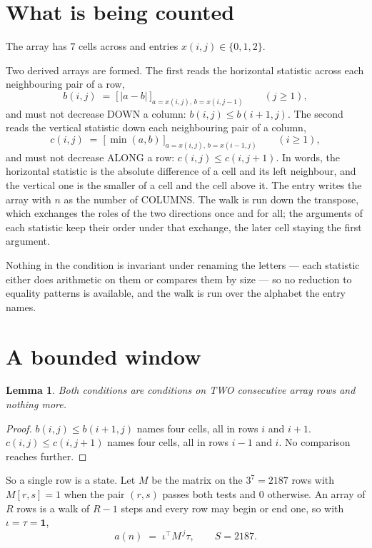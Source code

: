 \documentclass[11pt,a4paper]{article}
\theoremstyle{plain}
\newtheorem{lemma}[theorem]{Lemma}
\theoremstyle{definition}
\begin{document}
\section{What is being counted}

The array has $7$ cells across and entries $x(i,j)\in\{0,1,2\}$.

Two derived arrays are formed. The first reads the horizontal statistic across each
neighbouring pair of a row,
\[
b(i,j)\;=\;\bigl[\,\lvert a-b\rvert\,\bigr]_{a=x(i,j),\,b=x(i,j-1)}\qquad (j\ge1),
\]
and must not decrease DOWN a column: $b(i,j)\le b(i{+}1,j)$. The second reads the vertical
statistic down each neighbouring pair of a column,
\[
c(i,j)\;=\;\bigl[\,\min(a,b)\,\bigr]_{a=x(i,j),\,b=x(i{-}1,j)}\qquad (i\ge1),
\]
and must not decrease ALONG a row: $c(i,j)\le c(i,j{+}1)$. In words, the horizontal statistic
is the absolute difference of a cell and its left neighbour, and the vertical one is
the smaller of a cell and the cell above it. The entry writes the array with $n$ as the number of COLUMNS. The walk is run down the transpose, which exchanges the roles of the two directions once and for all; the arguments of each statistic keep their order under that exchange, the later cell staying the first argument.

Nothing in the condition is invariant under renaming the letters --- each statistic either does
arithmetic on them or compares them by size --- so no reduction to equality patterns is
available, and the walk is run over the alphabet the entry names.

\section{A bounded window}

\begin{lemma}\label{lem:win}
Both conditions are conditions on TWO consecutive array rows and nothing more.
\end{lemma}

\begin{proof}
$b(i,j)\le b(i{+}1,j)$ names four cells, all in rows $i$ and $i+1$. $c(i,j)\le c(i,j{+}1)$
names four cells, all in rows $i-1$ and $i$. No comparison reaches further.
\end{proof}

So a single row is a state. Let $M$ be the matrix on the $3^{7}=2187$ rows with
$M[r,s]=1$ when the pair $(r,s)$ passes both tests and $0$ otherwise. An array of $R$ rows is a
walk of $R-1$ steps and every row may begin or end one, so with $\iota=\tau=\mathbf{1}$,
\[
a(n)\;=\;\iota^{\!\top}M^{\,j}\tau ,\qquad S=2187.
\]
\end{document}
